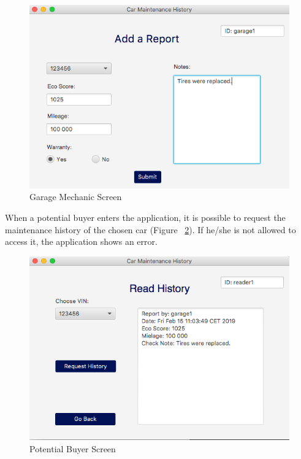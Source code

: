 \begin{figure}[H]
    \centering
    \includegraphics[width=1\textwidth]{Figures/DesktopApp/addReportScreen.png}
    \vspace{-15pt}
    \caption{Garage Mechanic Screen}
    \label{Garage Mechanic Screen}
\end{figure}
\noindent
When a potential buyer enters the application, it is possible to request the maintenance history of the chosen car (Figure ~\ref{Reader Screen}). If he/she is not allowed to access it, the application shows an error. 
\begin{figure}[H]
    \centering
    \includegraphics[width=1\textwidth]{Figures/DesktopApp/readHistoryScreen.png}
    \vspace{-15pt}
    \caption{Potential Buyer Screen}
    \label{Reader Screen}
\end{figure}


